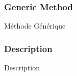 




\bigskip






\subsubsection{Generic Method}{Méthode Générique}




\subsubsection{Description}{Description}


